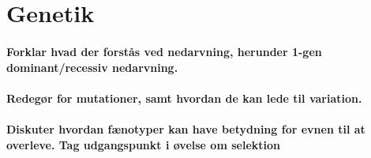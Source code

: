 \newpage
\part{Genetik}
\subsection*{Forklar hvad der forstås ved nedarvning, herunder 1-gen dominant/recessiv nedarvning.}
\subsection*{Redegør for mutationer, samt hvordan de kan lede til variation.}
\subsection*{Diskuter hvordan fænotyper kan have betydning for evnen til at overleve. Tag udgangspunkt i øvelse om selektion}